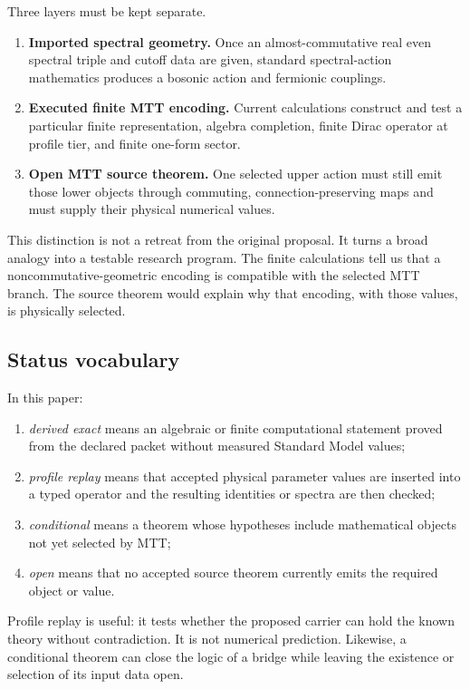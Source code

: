 \documentclass[11pt]{article}
\begin{document}
Three layers must be kept separate.
\begin{enumerate}
\item \textbf{Imported spectral geometry.}  Once an almost-commutative real
even spectral triple and cutoff data are given, standard spectral-action
mathematics produces a bosonic action and fermionic couplings.
\item \textbf{Executed finite MTT encoding.}  Current calculations construct
and test a particular finite representation, algebra completion, finite Dirac
operator at profile tier, and finite one-form sector.
\item \textbf{Open MTT source theorem.}  One selected upper action must still
emit those lower objects through commuting, connection-preserving maps and
must supply their physical numerical values.
\end{enumerate}

This distinction is not a retreat from the original proposal.  It turns a
broad analogy into a testable research program.  The finite calculations tell
us that a noncommutative-geometric encoding is compatible with the selected
MTT branch.  The source theorem would explain why that encoding, with those
values, is physically selected.

\subsection{Status vocabulary}

\begin{definition}\label{def:tiers}
In this paper:
\begin{enumerate}
\item \emph{derived exact} means an algebraic or finite computational statement
proved from the declared packet without measured Standard Model values;
\item \emph{profile replay} means that accepted physical parameter values are
inserted into a typed operator and the resulting identities or spectra are
then checked;
\item \emph{conditional} means a theorem whose hypotheses include mathematical
objects not yet selected by MTT;
\item \emph{open} means that no accepted source theorem currently emits the
required object or value.
\end{enumerate}
\end{definition}

Profile replay is useful: it tests whether the proposed carrier can hold the
known theory without contradiction.  It is not numerical prediction.
Likewise, a conditional theorem can close the logic of a bridge while leaving
the existence or selection of its input data open.
\end{document}
